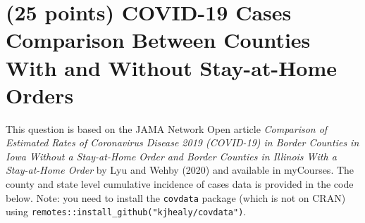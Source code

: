 \documentclass[letterpaper,12pt,twoside,]{pinp}
\begin{document}
\newpage

\hypertarget{points-covid-19-cases-comparison-between-counties-with-and-without-stay-at-home-orders}{%
\section{(25 points) COVID-19 Cases Comparison Between Counties With and
Without Stay-at-Home
Orders}\label{points-covid-19-cases-comparison-between-counties-with-and-without-stay-at-home-orders}}

This question is based on the JAMA Network Open article \emph{Comparison
of Estimated Rates of Coronavirus Disease 2019 (COVID-19) in Border
Counties in Iowa Without a Stay-at-Home Order and Border Counties in
Illinois With a Stay-at-Home Order} by Lyu and Wehby (2020) and
available in myCourses. The county and state level cumulative incidence
of cases data is provided in the code below. Note: you need to install
the \texttt{covdata} package (which is not on CRAN) using
\texttt{remotes::install\_github("kjhealy/covdata")}.
\end{document}
